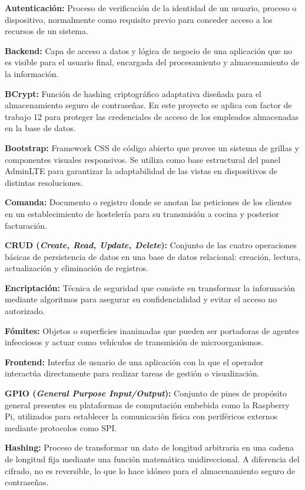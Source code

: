 \noindent
\textbf{Autenticación:} Proceso de verificación de la identidad de un usuario, proceso o dispositivo, normalmente como requisito previo para conceder acceso a los recursos de un sistema.

\noindent
\textbf{Backend:} Capa de acceso a datos y lógica de negocio de una aplicación que no es visible para el usuario final, encargada del procesamiento y almacenamiento de la información.

\noindent
\textbf{BCrypt:} Función de hashing criptográfico adaptativa diseñada para el almacenamiento seguro de contraseñas. En este proyecto se aplica con factor de trabajo 12 para proteger las credenciales de acceso de los empleados almacenadas en la base de datos.

\noindent
\textbf{Bootstrap:} Framework CSS de código abierto que provee un sistema de grillas y componentes visuales responsivos. Se utiliza como base estructural del panel AdminLTE para garantizar la adaptabilidad de las vistas en dispositivos de distintas resoluciones.

\noindent
\textbf{Comanda:} Documento o registro donde se anotan las peticiones de los clientes en un establecimiento de hostelería para su transmisión a cocina y posterior facturación.

\noindent
\textbf{CRUD (\textit{Create, Read, Update, Delete}):} Conjunto de las cuatro operaciones básicas de persistencia de datos en una base de datos relacional: creación, lectura, actualización y eliminación de registros.

\noindent
\textbf{Encriptación:} Técnica de seguridad que consiste en transformar la información mediante algoritmos para asegurar su confidencialidad y evitar el acceso no autorizado.

\noindent
\textbf{Fómites:} Objetos o superficies inanimadas que pueden ser portadoras de agentes infecciosos y actuar como vehículos de transmisión de microorganismos.

\noindent
\textbf{Frontend:} Interfaz de usuario de una aplicación con la que el operador interactúa directamente para realizar tareas de gestión o visualización.

\noindent
\textbf{GPIO (\textit{General Purpose Input/Output}):} Conjunto de pines de propósito general presentes en plataformas de computación embebida como la Raspberry Pi, utilizados para establecer la comunicación física con periféricos externos mediante protocolos como SPI.

\noindent
\textbf{Hashing:} Proceso de transformar un dato de longitud arbitraria en una cadena de longitud fija mediante una función matemática unidireccional. A diferencia del cifrado, no es reversible, lo que lo hace idóneo para el almacenamiento seguro de contraseñas.

